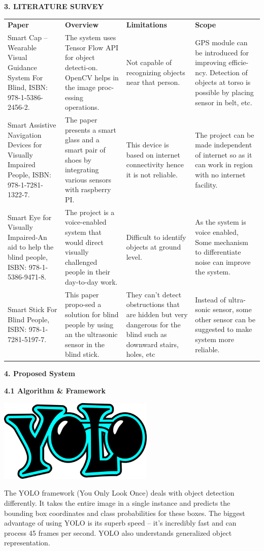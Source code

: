 \documentclass{article}
\begin{document}
\textbf{3. LITERATURE SURVEY}

\begin{longtable}[]{@{}llll@{}}
\toprule
\endhead
\textbf{Paper} & \textbf{Overview} & \textbf{Limitations} &
\textbf{Scope}\tabularnewline
Smart Cap -- Wearable Visual Guidance System For Blind, ISBN:
978-1-5386-2456-2. & The system uses Tensor Flow API for object
detecti-on. OpenCV helps in the image proc-essing operations. & Not
capable of recognizing objects near that person. & GPS module can be
introduced for improving efficie-ncy. Detection of objects at torso is
possible by placing sensor in belt, etc.\tabularnewline
Smart Assistive Navigation Devices for Visually Impaired People, ISBN:
978-1-7281-1322-7. & The paper presents a smart glass and a smart pair
of shoes by integrating various sensors with raspberry PI. & This device
is based on internet connectivity hence it is not reliable. & The
project can be made independent of internet so as it can work in region
with no internet facility.\tabularnewline
Smart Eye for Visually Impaired-An aid to help the blind people, ISBN:
978-1-5386-9471-8. & The project is a voice-enabled system that would
direct visually challenged people in their day-to-day work. & Difficult
to identify objects at ground level. & As the system is voice enabled,
Some mechanism to differentiate noise can improve the
system.\tabularnewline
Smart Stick For Blind People, ISBN: 978-1-7281-5197-7. & This paper
propo-sed a solution for blind people by using an the ultrasonic sensor
in the blind stick. & They can't detect obstructions that are hidden but
very dangerous for the blind such as downward stairs, holes, etc &
Instead of ultra-sonic sensor, some other sensor can be suggested to
make system more reliable.\tabularnewline
\bottomrule
\end{longtable}

\textbf{4. Proposed System}

\textbf{4.1 Algorithm \& Framework}

\includegraphics[width=2.925in,height=1.55347in]{media/image2.bmp}

The YOLO framework (You Only Look Once) deals with object detection
differently. It takes the entire image in a single instance and predicts
the bounding box coordinates and class probabilities for these boxes.
The biggest advantage of using YOLO is its superb speed -- it's
incredibly fast and can process 45 frames per second. YOLO also
understands generalized object representation.
\end{document}
